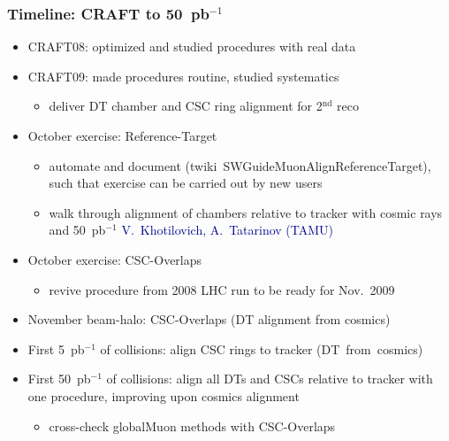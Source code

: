 \documentclass[compress]{beamer}
\begin{document}
\begin{frame}
\frametitle{Timeline: CRAFT to 50~pb$^{-1}$}
\begin{itemize}
\item CRAFT08: optimized and studied procedures with real data
\item CRAFT09: made procedures routine, studied systematics
\begin{itemize}
\item deliver DT chamber and CSC ring alignment for 2$^{\mbox{nd}}$ reco
\end{itemize}

\item October exercise: Reference-Target
\begin{itemize}
\item automate and document \mbox{\scriptsize (twiki SWGuideMuonAlignReferenceTarget),\hspace{-0.5 cm}} \\ such
  that exercise can be carried out by new users
\item walk through alignment of chambers relative to tracker with cosmic rays and 50~pb$^{-1}$ \hfill \textcolor{darkblue}{\scriptsize V.~Khotilovich, A.~Tatarinov (TAMU)}
\end{itemize}
\item October exercise: CSC-Overlaps
\begin{itemize}
\item revive procedure from 2008 LHC run to be ready for Nov.~2009
\end{itemize}

\item November beam-halo: CSC-Overlaps (DT alignment from cosmics)
\item First 5~pb$^{-1}$ of collisions: align CSC rings to tracker \mbox{(DT from cosmics)\hspace{-1 cm}}
\item First 50~pb$^{-1}$ of collisions: align all DTs and CSCs relative to tracker with one procedure, improving upon cosmics alignment
\begin{itemize}
\item cross-check globalMuon methods with CSC-Overlaps
\end{itemize}
\end{itemize}
\end{frame}
\end{document}

